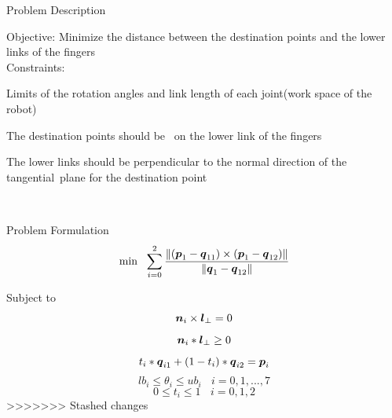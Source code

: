 \documentclass[10pt, compress]{beamer}
\begin{document}



\begin{frame}[fragile] {Problem Description} 

Objective: Minimize the distance between the destination points and the lower links of the fingers \\
	
Constraints: 
\begin{itemize} Limits of the rotation angles and link length of each joint(work space of the  robot)
\end{itemize}
\begin{itemize}
	The destination points should be  on the lower link of the fingers
\end{itemize}
\begin{itemize}
	The lower links should be perpendicular to the normal direction of the tangential plane for the destination point
\end{itemize} 	
	
\end{frame}



\begin{frame}[fragile] {Problem Formulation} 
\[
\min \ \  \sum_{i=0}^{2} \frac{\|(\pb_1-\qb_{11})\times (\pb_1-\qb_{12}) \|}{\|\qb_1-\qb_{12}\|}
\]

Subject to 
\[
\mbox{\boldmath $n$}_i \times \mbox{\boldmath $l$}_\bot =0
\]
\[
\mbox{\boldmath $n$}_i * \mbox{\boldmath $l$}_\bot \geq 0
\]
\[
 t_i* \mbox{\boldmath $q$}_{i1} +(1-t_i) * \mbox{\boldmath $q$}_{i2} = \mbox{\boldmath $p$}_i
\]
\[
lb_i \leq \theta_i \leq ub_i  \ \ \ \     i=0, 1, ..., 7
\]
\[
0 \leq t_i  \leq 1    \ \ \ \     i=0, 1, 2
\]
>>>>>>> Stashed changes

\end{frame}
\end{document}
